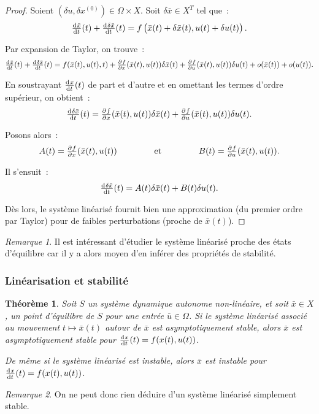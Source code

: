 \documentclass{article}
\newtheorem{thm}{Théorème}[section]
\theoremstyle{definition}
\theoremstyle{remark}
\newtheorem*{rmq}{Remarque}
\begin{document}
	\begin{proof} Soient $(\delta u, \delta x^{(0)}) \in \Omega \times X$. Soit $\delta \bar x \in X^T$ tel que~:
	\[\od {\bar x}t(t) + \od {\delta \bar x}t(t) = f\left(\bar x(t) + \delta \bar x(t), u(t) + \delta u(t)\right).\]

	Par expansion de Taylor, on trouve~:
	\[\od {\bar x}t(t) + \od {\delta \bar x}t(t) = f(\bar x(t), u(t), t) + \pd fx(\bar x(t), u(t))\delta \bar x(t) + \pd fu(\bar x(t), u(t))\delta u(t) + o(\bar x(t)) + o(u(t)).\]

	En soustrayant $\od xt(t)$ de part et d'autre et en omettant les termes d'ordre supérieur, on obtient~:
	\[\od {\delta \bar x}t(t) = \pd fx(\bar x(t), u(t))\delta \bar x(t) + \pd fu(\bar x(t), u(t))\delta u(t).\]

	Posons alors~:
	\[A(t) = \pd fx(\bar x(t), u(t)) \qquad\qquad \text{ et } \qquad\qquad B(t) = \pd fu(\bar x(t), u(t)).\]

	Il s'ensuit~:
	\[\od {\delta \bar x}t(t) = A(t)\delta \bar x(t) + B(t)\delta u(t).\]

	Dès lors, le système linéarisé fournit bien une approximation (du premier ordre par Taylor) pour de faibles perturbations (proche de $\bar x(t)$).
	\end{proof}

	\begin{rmq} Il est intéressant d'étudier le système linéarisé proche des états d'équilibre car il y a alors moyen d'en inférer des propriétés de stabilité.
	\end{rmq}

		\subsubsection{Linéarisation et stabilité}

	\begin{thm} Soit $S$ un système dynamique autonome non-linéaire, et soit $\bar x \in X$, un point d'équilibre de $S$ pour une entrée $\bar u \in \Omega$. Si
	le système linéarisé associé au mouvement $t \mapsto \bar x(t)$ autour de $\bar x$ est asymptotiquement stable, alors $\bar x$ est asymptotiquement stable
	pour $\od xt(t) = f(x(t), u(t))$.

	De même si le système linéarisé est instable, alors $\bar x$ est instable pour $\od xt(t) = f(x(t), u(t))$.
	\end{thm}

	\begin{rmq} On ne peut donc rien déduire d'un système linéarisé simplement stable.
	\end{rmq}
\end{document}
